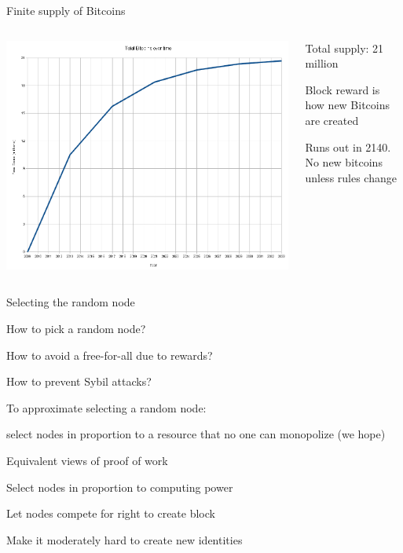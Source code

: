 \begin{frame}{Finite supply of Bitcoins}
	
\begin{columns}[T]
\begin{column}{0.55\textwidth}
\includegraphics[width=\textwidth]{bitcoin.png}
\end{column}
\begin{column}{0.45\textwidth}
\BI
\item Total supply: 21 million
\item Block reward is how new Bitcoins are created
\item Runs out in 2140. No new bitcoins unless rules change
\EI
\end{column}
\end{columns}
\end{frame}

\begin{frame}{Selecting the random node}

\BI
\item How to pick a random node?
\item How to avoid a free-for-all due to rewards?
\item How to prevent Sybil attacks?
\EI

\BIL
\item To approximate selecting a random node: 
	\BI
	\item select nodes in proportion to a resource that no one can monopolize (we hope)
	\EI
\item Equivalent views of proof of work
	\BI
	\item Select nodes in proportion to computing power
	\item Let nodes compete for right to create block
	\item Make it moderately hard to create new identities
	\EI
\EIL

\end{frame}


